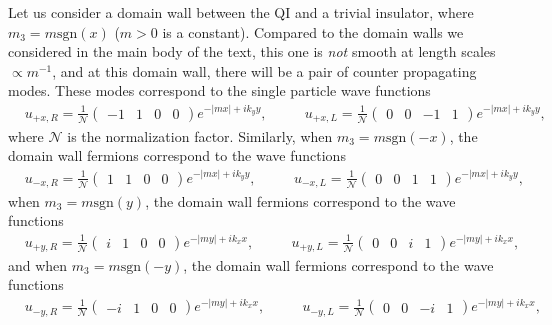 \documentclass[%
 reprint,
 amsmath,amssymb,
 aps,
]{revtex4-1}
\begin{document}
\begin{appendix}
Let us consider a domain wall between the QI and a trivial insulator, where $m_3 = m\text{sgn}(x)$ ($m>0$ is a constant). Compared to the domain walls we considered in the main body of the text, this one is \textit{not} smooth at length scales $\propto m^{-1}$, and at this domain wall, there will be a pair of counter propagating modes. These modes correspond to the single particle wave functions
\begin{equation}\begin{split}
&u_{+x,R} = \tfrac{1}{\mathcal{N}} \begin{pmatrix} -1&1&0&0 \end{pmatrix} e^{- |m x|+ i k_y y}, \phantom{==}u_{+x,L} = \tfrac{1}{\mathcal{N}}  \begin{pmatrix} 0&0&-1&1 \end{pmatrix} e^{- |m x| + i k_y y},
\label{Aeq:DWFermionsX}\end{split}\end{equation}
where $\mathcal{N}$ is the normalization factor. Similarly, when $m_3 = m\text{sgn}(-x)$, the domain wall fermions correspond to the wave functions
\begin{equation}\begin{split}
&u_{-x,R} = \tfrac{1}{\mathcal{N}} \begin{pmatrix} 1&1&0&0 \end{pmatrix} e^{- |m x|+ i k_y y}, \phantom{==}u_{-x,L} = \tfrac{1}{\mathcal{N}}  \begin{pmatrix} 0&0&1&1 \end{pmatrix} e^{- |m x| + i k_y y},
\label{Aeq:DWFermionsX2}\end{split}\end{equation}
 when $m_3 = m\text{sgn}(y)$, the domain wall fermions correspond to the wave functions
\begin{equation}\begin{split}
&u_{+y,R}= \tfrac{1}{\mathcal{N}}  \begin{pmatrix} i&1&0&0 \end{pmatrix} e^{- |m y|+ i k_x x}, \phantom{==}u_{+y,L} = \tfrac{1}{\mathcal{N}}  \begin{pmatrix} 0&0&i&1 \end{pmatrix} e^{- |my| + i k_x x},
\label{Aeq:DWFermionsY}\end{split}\end{equation}
and when $m_3 = m\text{sgn}(-y)$, the domain wall fermions correspond to the wave functions
\begin{equation}\begin{split}
&u_{-y,R}= \tfrac{1}{\mathcal{N}}  \begin{pmatrix} -i&1&0&0 \end{pmatrix} e^{- |m y|+ i k_x x}, \phantom{==}u_{-y,L} = \tfrac{1}{\mathcal{N}}  \begin{pmatrix} 0&0&-i&1 \end{pmatrix} e^{- |my| + i k_x x},
\label{Aeq:DWFermionsY2}\end{split}\end{equation}


\end{appendix}
\end{document}
